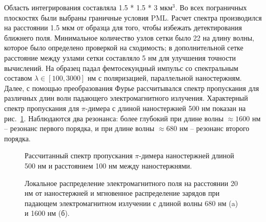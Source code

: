 Область интегрирования составляла 1.5 * 1.5 * 3 мкм$ ^3 $. Во всех пограничных плоскостях были выбраны граничные условия PML. Расчет спектра производился на расстоянии 1.5 мкм от образца для того, чтобы избежать детектирования ближнего поля. Минимальное количество узлов сетки было 22 на длину волны, которое было определено проверкой на сходимость; в дополнительной сетке расстояние между узлами сетки составляло 5 нм для улучшения точности вычислений. На образец падал фемтосекундный импульс со спектральным составом $ \lambda \in [ 100, 3000 ] $ нм с поляризацией, параллельной наностержням. Далее, с помощью преобразования Фурье рассчитывался спектр пропускания для различных длин волн падающего электромагнитного излучения. Характерный спектр пропускания для $ \pi $-димера с длиной наностержней 500 нм показан на рис.~\ref{img:spectraFDTDa500d100}. Наблюдаются два резонанса: более глубокий при длине волны $ \approx 1600 $ нм  -- резонанс первого порядка, и при длине волны $ \approx 680 $ нм -- резонанс второго порядка.
\begin{figure}
\caption{Рассчитанный спектр пропускания $ \pi $-димера наностержней длиной 500 нм и расстоянием 100 нм между наностержнями.}
\label{img:spectraFDTDa500d100}
\end{figure}
\begin{figure}
\caption{Локальное распределение электромагнитного поля на расстоянии 20 нм от наностержней и мгновенное распределение зарядов при падающем электромагнитном излучении с длиной волны 680 нм (a) и 1600 нм (б).}
\label{img:locala500d100FDTD}
\end{figure}
